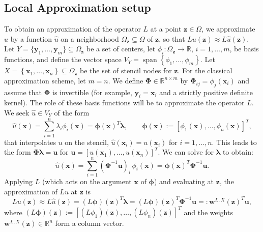 \documentclass[11pt]{article}
\begin{document}
\subsection{Local Approximation setup}
To obtain an approximation of the operator $L$ at a point $\bm{z} \in \Omega$, we approximate $u$ by a function $\hat{u}$ on a neighborhood $\Omega_{\bm{z}} \subseteq \Omega$ of $\bm{z}$, so that $Lu(\bm{z}) \approx L\hat{u}(\bm{z})$. Let $Y = \{ \bm{y}_1, \dots, \bm{y}_m \} \subseteq \Omega_{\bm{z}}$ be a set of centers, let $\phi_i:\Omega_{\bm{z}} \rightarrow \mathbb{R}$, $i = 1, \dots, m$, be basis functions, and define the vector space $V_Y = \operatorname{span}\left\{ \phi_1, \dots, \phi_m \right\}$. Let $X = \left\{ \bm{x}_1, \dots, \bm{x}_n \right\} \subseteq \Omega_{\bm{z}}$ be the set of stencil nodes for $\bm{z}$. For the classical approximation scheme, let $m=n$. We define $\bm{\Phi} \in \mathbb{R}^{n \times m}$ by $\bm{\Phi}_{ij} = \phi_j(\bm{x}_i)$ and assume that $\bm{\Phi}$ is invertible (for example, $\bm{y}_i = \bm{x}_i$ and a strictly positive definite kernel). The role of these basis functions will be to approximate the operator $L$. We seek $\hat{u} \in V_Y$ of the form
\begin{equation}
	\hat{u}(\bm{x}) = \sum_{i=1}^n \lambda_i \phi_i(\bm{x}) = \bm{\phi}(\bm{x})^T \bm{\lambda}, \qquad \bm{\phi}(\bm{x}) := [\phi_1(\bm{x}), \dots, \phi_n(\bm{x})]^T,
\end{equation}
that interpolates $u$ on the stencil, $\hat{u}(\bm{x}_i) = u(\bm{x}_i)$ for $i = 1, \dots, n$. This leads to the form $\bm{\Phi} \bm{\lambda} = \bm{u}$ for $\bm{u} = [ u(\bm{x}_1), \dots, u(\bm{x}_n) ]^T$. We can solve for $\bm{\lambda}$ to obtain:
\begin{equation*}
	\hat{u}(\bm{x}) = \sum_{i=1}^n (\bm{\Phi}^{-1} \bm{u})_i \, \phi_i(\bm{x}) = \bm{\phi}(\bm{x})^T \bm{\Phi}^{-1} \bm{u}.
\end{equation*}
Applying $L$ (which acts on the argument $\bm{x}$ of $\bm{\phi}$) and evaluating at $\bm{z}$, the approximation of $Lu$ at $\bm{z}$ is
\begin{equation}
	Lu (\bm{z}) \approx L \hat{u} (\bm{z}) = (L \bm{\phi})(\bm{z})^T \bm{\lambda} = (L \bm{\phi})(\bm{z})^T \bm{\Phi}^{-1} \bm{u} =: \bm{w}^{L, X}(\bm{z})^T \bm{u},
\end{equation}
where $(L \bm{\phi})(\bm{z}) := [ (L\phi_1)(\bm{z}), \dots, (L\phi_n)(\bm{z}) ]^T$ and the weights $\bm{w}^{L, X}(\bm{z}) \in \mathbb{R}^n$ form a column vector.
\end{document}

